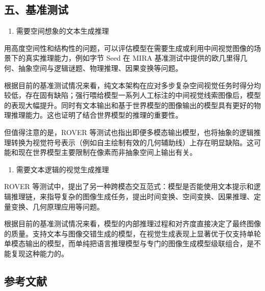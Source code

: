 \hypertarget{ux4e94ux57faux51c6ux6d4bux8bd5}{%
\subsection{五、基准测试}\label{ux4e94ux57faux51c6ux6d4bux8bd5}}

\begin{enumerate}
\def\labelenumi{\arabic{enumi}.}
\tightlist
\item
  需要空间想象的文本生成推理
\end{enumerate}

用高度空间性和结构性的问题，可以评估模型在需要生成或利用中间视觉图像的场景下的真实推理能力，例如字节 Seed 在 MIRA 基准测试中提供的欧几里得几何、抽象空间与逻辑谜题、物理推理、因果变换等问题。

根据目前的基准测试情况来看，纯文本架构在应对多步复杂空间视觉任务时得分均较低，存在固有缺陷；强行喂给模型一系列人工标注的中间视觉线索图像后，模型的表现大幅提升。同时有文本输出和基于世界模型的图像输出的模型具有更好的物理推理能力。这也证明了结合世界模型的推理的重要性。

但值得注意的是，ROVER 等测试也指出即便多模态输出模型，也将抽象的逻辑推理转换为视觉符号表示（例如自主绘制有效的几何辅助线）上存在明显缺陷。这可能和现在世界模型主要限制在像素而非抽象空间上输出有关。

\begin{enumerate}
\def\labelenumi{\arabic{enumi}.}
\setcounter{enumi}{1}
\tightlist
\item
  需要文本逻辑的视觉生成推理
\end{enumerate}

ROVER 等测试中，提出了另一种跨模态交互范式：模型是否能使用文本提示和逻辑推理链，来指导复杂的图像生成任务，提出时间变换、空间变换、因果推理、定量变换、几何原理应用等问题。

根据目前的基准测试情况来看，模型的内部推理过程和对齐度直接决定了最终图像的质量。支持文本与图像交错生成的模型，在视觉生成表现上显著优于仅支持单轮单模态输出的模型，而单纯把语言推理模型与专门的图像生成模型级联组合，是不能复现这种能力的。

\hypertarget{ux53c2ux8003ux6587ux732e-195}{%
\subsection{参考文献}\label{ux53c2ux8003ux6587ux732e-195}}

